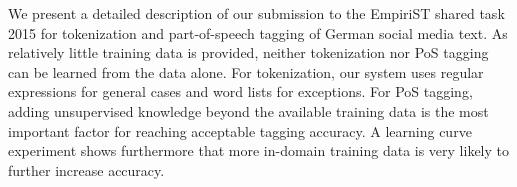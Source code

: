 We present a detailed description of our submission to the EmpiriST shared task 2015 for tokenization and part-of-speech tagging of German social media text. As relatively little training data is provided, neither tokenization nor PoS tagging can be learned from the data alone. For tokenization, our system uses regular expressions for general cases and word lists for exceptions. For PoS tagging, adding unsupervised knowledge beyond the available training data is the most important factor for reaching acceptable tagging accuracy. A learning curve experiment shows furthermore that more in-domain training data is very likely to further increase accuracy.
